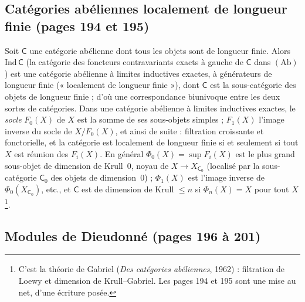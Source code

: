 \documentclass[11pt,a4paper]{article}
\begin{document}
\subsection*{Catégories abéliennes localement de longueur finie (pages 194 et 195)}

Soit $\mathsf{C}$ une catégorie abélienne dont tous les objets sont de longueur
finie. Alors $\mathrm{Ind}\,\mathsf{C}$ (la catégorie des foncteurs
contravariants exacts à gauche de $\mathsf{C}$ dans $(\mathrm{Ab})$) est une
catégorie abélienne à limites inductives exactes, à générateurs de longueur finie
(« localement de longueur finie »), dont $\mathsf{C}$ est la sous-catégorie des
objets de longueur finie ; d'où une correspondance biunivoque entre les deux sortes
de catégories. Dans une catégorie abélienne à limites inductives exactes, le
\emph{socle} $F_0(X)$ de $X$ est la somme de ses sous-objets simples ; $F_1(X)$
l'image inverse du socle de $X/F_0(X)$, et ainsi de suite : filtration croissante
et fonctorielle, et la catégorie est localement de longueur finie si et seulement
si tout $X$ est réunion des $F_i(X)$. En général $\Phi_0(X) = \sup F_i(X)$ est le
plus grand sous-objet de dimension de Krull~$0$, noyau de $X \to X_{\mathsf{C}_0}$
(localisé par la sous-catégorie $\mathsf{C}_0$ des objets de dimension~$0$) ;
$\Phi_1(X)$ est l'image inverse de $\Phi_0(X_{\mathsf{C}_0})$, etc., et
$\mathsf{C}$ est de dimension de Krull $\leq n$ si $\Phi_n(X) = X$ pour tout
$X$\footnote{C'est la théorie de Gabriel (\emph{Des catégories abéliennes}, 1962) :
filtration de Loewy et dimension de Krull--Gabriel. Les pages 194 et 195 sont une
mise au net, d'une écriture posée.}.

\subsection*{Modules de Dieudonné (pages 196 à 201)}
\end{document}
